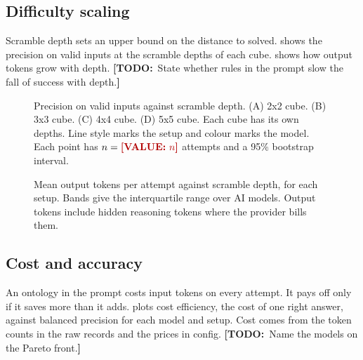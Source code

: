 \documentclass[10pt,twocolumn,letterpaper]{article}
\newcommand{\todo}[1]{{\color{red!70!black}\textbf{[TODO:}~#1\textbf{]}}}
\newcommand{\val}[1]{{\color{red!70!black}\textbf{[VALUE:}~#1\textbf{]}}}
\begin{document}
\subsection{Difficulty scaling}\label{sec:res-depth}
Scramble depth sets an upper bound on the distance to solved.  shows the precision on valid inputs at the scramble depths of each cube.  shows how output tokens grow with depth. \todo{State whether rules in the prompt slow the fall of success with depth.}

\begin{figure}[!htbp]
\begin{phcanvas}
\end{phcanvas}
\caption{Precision on valid inputs against scramble depth. (A) 2x2 cube. (B) 3x3 cube. (C) 4x4 cube. (D) 5x5 cube. Each cube has its own depths. Line style marks the setup and colour marks the model. Each point has $n = \val{n}$ attempts and a 95\% bootstrap interval.}
\label{fig:depth}
\end{figure}

\begin{figure}[!htbp]
\caption{Mean output tokens per attempt against scramble depth, for each setup. Bands give the interquartile range over AI models. Output tokens include hidden reasoning tokens where the provider bills them.}
\label{fig:tokens}
\end{figure}

\subsection{Cost and accuracy}\label{sec:res-cost}
An ontology in the prompt costs input tokens on every attempt. It pays off only if it saves more than it adds.  plots cost efficiency, the cost of one right answer, against balanced precision for each model and setup. Cost comes from the token counts in the raw records and the prices in config. \todo{Name the models on the Pareto front.}
\end{document}
